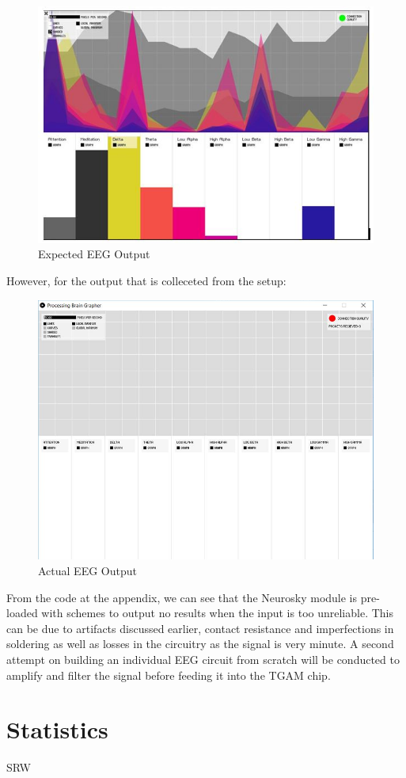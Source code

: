 \begin{figure}[H]
	\centering
	\includegraphics[width=0.8\linewidth]{jiahuipic6.jpg}
	\caption{Expected EEG Output}
\end{figure} 

However, for the output that is colleceted from the setup: 

\begin{figure}[H]
	\centering
	\includegraphics[width=0.8\linewidth]{jiahuipic7.jpg}
	\caption{Actual EEG Output}
\end{figure} 

From the code at the appendix, we can see that the Neurosky module is pre-loaded with schemes to output no results when the input is too unreliable. This can be due to artifacts discussed earlier, contact resistance and imperfections in soldering as well as losses in the circuitry as the signal is very minute. A second attempt on building an individual EEG circuit from scratch will be conducted to amplify and filter the signal before feeding it into the TGAM chip.

\section{Statistics}

SRW
